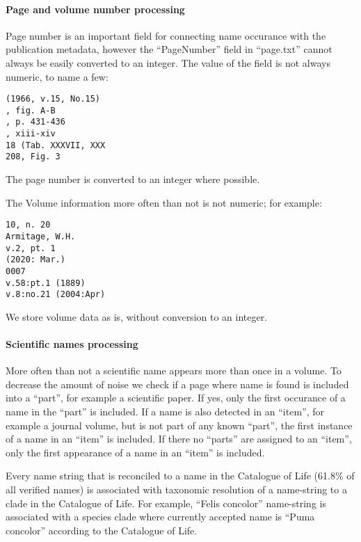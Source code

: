 \documentclass[
]{article}
\begin{document}
\hypertarget{page-and-volume-number-processing}{%
\paragraph{Page and volume number
processing}\label{page-and-volume-number-processing}}

Page number is an important field for connecting name occurance with the
publication metadata, however the ``PageNumber'' field in ``page.txt''
cannot always be easily converted to an integer. The value of the field
is not always numeric, to name a few:

\begin{verbatim}
(1966, v.15, No.15)
, fig. A-B
, p. 431-436
, xiii-xiv
18 (Tab. XXXVII, XXX
208, Fig. 3
\end{verbatim}

The page number is converted to an integer where possible.

The Volume information more often than not is not numeric; for example:

\begin{verbatim}
10, n. 20
Armitage, W.H.
v.2, pt. 1
(2020: Mar.)
0007
v.58:pt.1 (1889)
v.8:no.21 (2004:Apr)
\end{verbatim}

We store volume data as is, without conversion to an integer.

\hypertarget{scientific-names-processing}{%
\paragraph{Scientific names
processing}\label{scientific-names-processing}}

More often than not a scientific name appears more than once in a
volume. To decrease the amount of noise we check if a page where name is
found is included into a ``part'', for example a scientific paper. If
yes, only the first occurance of a name in the ``part'' is included. If
a name is also detected in an ``item'', for example a journal volume,
but is not part of any known ``part'', the first instance of a name in
an ``item'' is included. If there no ``parts'' are assigned to an
``item'', only the first appearance of a name in an ``item'' is
included.

Every name string that is reconciled to a name in the Catalogue of Life
(61.8\% of all verified names) is associated with taxonomic resolution
of a name-string to a clade in the Catalogue of Life. For example,
``Felis concolor'' name-string is associated with a species clade where
currently accepted name is ``Puma concolor'' according to the Catalogue
of Life.
\end{document}
